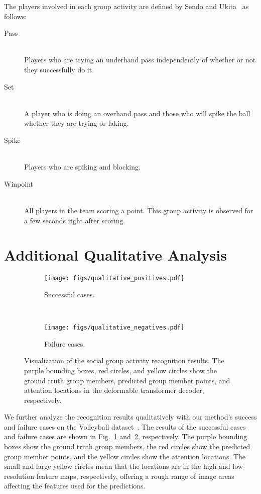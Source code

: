 \documentclass[runningheads]{llncs}
\begin{document}
The players involved in each group activity are defined by Sendo and Ukita~\cite{sendo_mva2019} as follows:
\begin{description}
\item[Pass]\mbox{}\\
Players who are trying an underhand pass independently of whether or not they successfully do it.
\item[Set]\mbox{}\\
A player who is doing an overhand pass and those who will spike the ball whether they are trying or faking.
\item[Spike]\mbox{}\\
Players who are spiking and blocking.
\item[Winpoint]\mbox{}\\
All players in the team  scoring a point. This group activity is observed for a few seconds right after scoring.

\end{description}

\section{Additional Qualitative Analysis}

\begin{figure}	
 \centering
 \begin{subfigure}[t]{1.0\linewidth}
  \centering
  \texttt{[image: figs/qualitative\_positives.pdf]}
  \caption{Successful cases.}\label{fig:q_positives}
 \end{subfigure} \\
 \begin{subfigure}[t]{1.0\linewidth}
  \centering
  \texttt{[image: figs/qualitative\_negatives.pdf]}
  \caption{Failure cases.}\label{fig:q_negatives}
 \end{subfigure}
 \caption{Visualization of the social group activity recognition results. The purple bounding boxes, red circles, and yellow circles show the ground truth group members, predicted group member points, and attention locations in the deformable transformer decoder, respectively.}\label{fig:qualitatives}
 \vspace{-1.0ex}
\end{figure}

We further analyze the recognition results qualitatively with our method's success and failure cases on the Volleyball dataset~\cite{ibrahim_cvpr2016}. The results of the successful cases and failure cases are shown in Fig.~\ref{fig:q_positives} and~\ref{fig:q_negatives}, respectively. The purple bounding boxes show the ground truth group members, the red circles show the predicted group member points, and the yellow circles show the attention locations. The small and large yellow circles mean that the locations are in the high and low-resolution feature maps, respectively, offering a rough range of image areas affecting the features used for the predictions.
\end{document}
